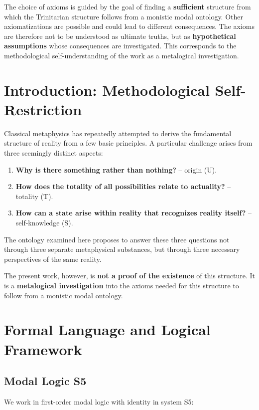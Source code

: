 \documentclass[
]{article}
\begin{document}
The choice of axioms is guided by the goal of finding a \textbf{sufficient} structure from which the Trinitarian structure follows from a monistic modal ontology. Other axiomatizations are possible and could lead to different consequences. The axioms are therefore not to be understood as ultimate truths, but as \textbf{hypothetical assumptions} whose consequences are investigated. This corresponds to the methodological self-understanding of the work as a metalogical investigation.

\section{Introduction: Methodological Self-Restriction}

Classical metaphysics has repeatedly attempted to derive the fundamental structure of reality from a few basic principles. A particular challenge arises from three seemingly distinct aspects:

\begin{enumerate}
\item \textbf{Why is there something rather than nothing?} – origin (U).
\item \textbf{How does the totality of all possibilities relate to actuality?} – totality (T).
\item \textbf{How can a state arise within reality that recognizes reality itself?} – self-knowledge (S).
\end{enumerate}

The ontology examined here proposes to answer these three questions not through three separate metaphysical substances, but through three necessary perspectives of the same reality.

The present work, however, is \textbf{not a proof of the existence} of this structure. It is a \textbf{metalogical investigation} into the axioms needed for this structure to follow from a monistic modal ontology.

\section{Formal Language and Logical Framework}

\subsection{Modal Logic S5}

We work in first-order modal logic with identity in system S5:
\end{document}
